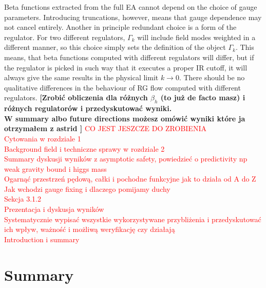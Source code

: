 \documentclass[11pt, a4paper]{article}
\newcommand{\jhkbf}[1]{\textbf{\color{red} [#1]}}
\begin{document}
Beta functions extracted from the full EA cannot depend on the choice of gauge parameters.
Introducing truncations, however, means that gauge dependence may not cancel entirely.
Another in principle redundant choice is a form of the regulator. For two different regulators,
$\Gamma_k$ will include field modes weighted in a different manner, so this choice simply
sets the definition of the object $\Gamma_k$. 
This means, that beta functions computed with different regulators will differ, but
if the regulator is picked in such way that it executes a proper IR cutoff,
it will always give the same results in the physical limit $k \rightarrow 0$. There should be no
qualitative differences in the behaviour of RG flow computed with different regulators.
\jhkbf{Zrobić obliczenia dla różnych $\beta_h$ (to już de facto masz) i różnych regulatorów i przedyskutować wyniki.\\ 
W summary albo future directions możesz omówić wyniki które ja otrzymałem z astrid
}
\textcolor{red}{
CO JEST JESZCZE DO ZROBIENIA\\
Cytowania w rozdziale 1\\
Background field i techniczne sprawy w rozdziale 2\\
Summary dyskusji wyników z asymptotic safety, powiedzieć o predictivity np weak gravity bound i higgs mass\\
Ogarnąć przestrzeń pędową, całki i pochodne funkcyjne jak to działa od A do Z\\
Jak wchodzi gauge fixing i dlaczego pomijamy duchy\\
Sekcja 3.1.2\\
Prezentacja i dyskusja wyników\\
Systematycznie wypisać wszystkie wykorzystywane przybliżenia i przedyskutować ich wpływ, ważność i możliwą weryfikację czy działają\\
Introduction i summary
}


\section*{Summary}
\end{document}
